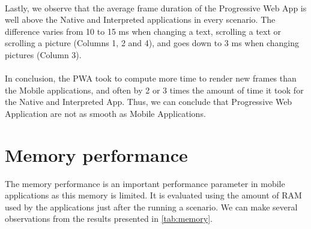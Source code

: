 \documentclass{kththesis}
\begin{document}
\paragraph{}
Lastly, we observe that the average frame duration of the Progressive Web App is well above the Native and Interpreted applications in every scenario. The difference varies from 10 to 15 ms when changing a text, scrolling a text or scrolling a picture (Columns 1, 2 and 4), and goes down to 3 ms when changing pictures (Column 3). 

\paragraph{}
In conclusion, the PWA took to compute more time to render new frames than the Mobile applications, and often by 2 or 3 times the amount of time it took for the Native and Interpreted App. Thus, we can conclude that Progressive Web Application are not as smooth as Mobile Applications.

\section{Memory performance}

The memory performance is an important performance parameter in mobile applications as this memory is limited. It is evaluated using the amount of RAM used by the applications just after the running a scenario. We can make several observations from the results presented in \autoref{tab:memory}. 
\end{document}
